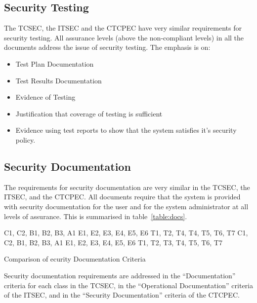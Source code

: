 
    \subsection{Security Testing} 
    The TCSEC, the ITSEC and the CTCPEC have very similar requirements
    for security testing. All assurance levels (above the non-compliant
    levels) in all the documents address the issue of security testing.
    The emphasis is on:
    \begin{itemize}
        \item Test Plan Documentation
        \item Test Results Documentation
        \item Evidence of Testing
        \item Justification that coverage of testing is sufficient
        \item Evidence using test reports to show that the system
              satisfies it's security policy.
    \end{itemize}


    \subsection{Security Documentation} 
    The requirements for security documentation are very similar in the TCSEC,
    the ITSEC, and the CTCPEC. All documents require that the system is provided
    with security documentation for the user and for the system administrator
    at all levels of assurance. This is summarised in table~\ref{table:docs}.
        \begin{table}[H]
        \bt
            {C1, C2, B1, B2, B3, A1}
            {E1, E2, E3, E4, E5, E6}
            {T1, T2, T4, T4, T5, T6, T7}
            {C1, C2, B1, B2, B3, A1}
            {E1, E2, E3, E4, E5, E6}
            {T1, T2, T3, T4, T5, T6, T7}
        \et
        \caption{Comparison of ecurity Documentation Criteria} \label{table:docs}
        \end{table}
    Security documentation requirements are addressed in the ``Documentation''
    criteria for each class in the TCSEC, in the ``Operational Documentation''
    criteria of the ITSEC, and in the ``Security Documentation''
    criteria of the CTCPEC.

